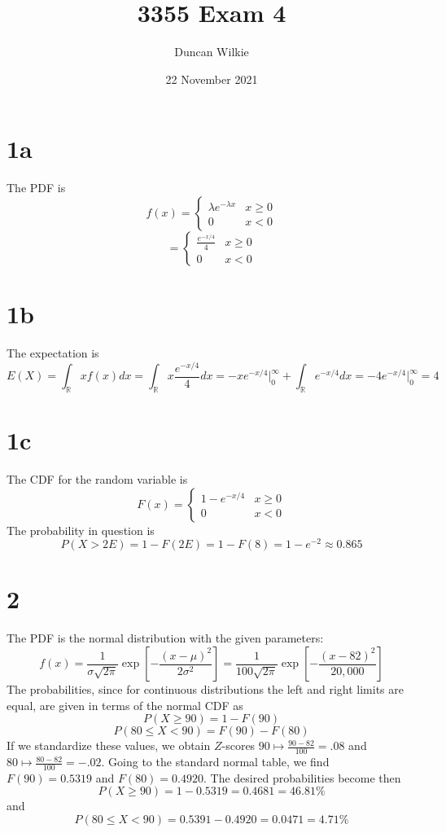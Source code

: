 \documentclass{article}
\title{3355 Exam 4}
\author{Duncan Wilkie}
\date{22 November 2021}
\begin{document}
\maketitle

\section*{1a}
The PDF is
\[f(x)=\begin{cases}\lambda e^{-\lambda x} & x\geq 0 \\ 0 & x < 0\end{cases}\]
\[=\begin{cases}\frac{e^{-x/4}}{4} & x\geq 0 \\ 0 & x < 0\end{cases}\]

\section*{1b}
The expectation is
\[E(X)=\int_\mathbb{R}xf(x)dx=\int_\mathbb{R}x\frac{e^{-x/4}}{4}dx
  =-x{e^{-x/4}}\bigg|_{0}^\infty+\int_\mathbb{R}e^{-x/4}dx = -4e^{-x/4}\bigg|_0^\infty=4\]

\section*{1c}
The CDF for the random variable is
\[F(x)=\begin{cases}
    1-e^{- x/4} & x\geq 0 \\
    0 & x < 0
  \end{cases}\]
The probability in question is
\[P(X > 2E) =1-F(2E)=1-F(8)=1-e^{-2}\approx0.865\]

\section*{2}
The PDF is the normal distribution with the given parameters:
\[f(x)=\frac{1}{\sigma\sqrt{2\pi}}\exp\left[ -\frac{(x-\mu)^2}{2\sigma^2} \right]=\frac{1}{100\sqrt{2\pi}}\exp\left[ -\frac{(x-82)^2}{20,000} \right]\]
The probabilities, since for continuous distributions the left and right limits are equal, are given in terms of the normal CDF as
\[P(X\geq 90)=1-F(90)\]
\[P(80\leq X< 90)=F(90)-F(80)\]
If we standardize these values, we obtain $Z$-scores $90\mapsto \frac{90-82}{100}=.08$ and $80\mapsto \frac{80-82}{100}=-.02$. Going to the standard normal table, we find $F(90)=0.5319$ and $F(80)=0.4920$. The desired probabilities become then
\[P(X\geq 90)=1-0.5319=0.4681=46.81\%\]
and
\[P(80\leq X<90)=0.5391-0.4920=0.0471=4.71\%\]
\end{document}
